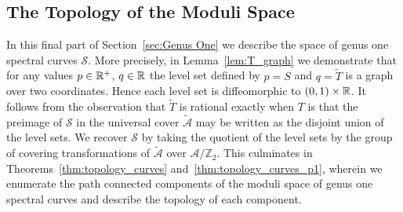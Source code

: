 \documentclass{article}
\begin{document}










\subsection{The Topology of the Moduli Space}\label{sub:Topology}

In this final part of Section~\ref{sec:Genus One} we describe the space of genus one spectral curves $\mathcal{S}$. 
More precisely,
in Lemma~\ref{lem:T_graph} we demonstrate that for any values $p \in \mathbb{R}^+$, $q\in\mathbb{R}$ the level set defined by $p = S$ and $q = \tilde{T}$ is a graph over two coordinates. 
Hence each level set is diffeomorphic to $(0,1)\times\mathbb{R}$.
It follows from the observation that $\tilde{T}$ is rational exactly when $T$ is that the preimage of $\mathcal{S}$ in the universal cover $\mathcal{\tilde{A}}$ may be written as the disjoint union of the level sets.
We recover $\mathcal{S}$ by taking the quotient of the level sets by the group of covering transformations of $\mathcal{\tilde{A}}$ over $\mathcal{A}/\mathbb{Z}_2$. This culminates in Theorems~\ref{thm:topology_curves} and~\ref{thm:topology_curves_p1}, wherein we enumerate the path connected components of the moduli space of genus one spectral curves and describe the topology of each component.
\end{document}
